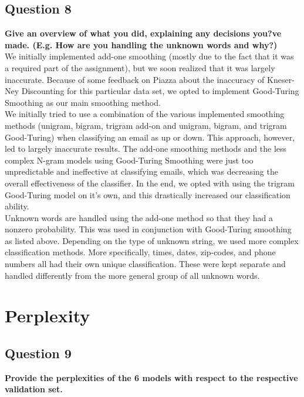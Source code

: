 \documentclass{article} %
\begin{document}
\subsection*{Question 8}

\textbf{Give an overview of what you did, explaining any decisions you?ve made. (E.g. How are you handling the unknown words and why?)}
\\

We initially implemented add-one smoothing (mostly due to the fact that it was a required part of the assignment), but we soon realized that it was largely inaccurate. Because of some feedback on Piazza about the inaccuracy of Kneser-Ney Discounting for this particular data set, we opted to implement Good-Turing Smoothing as our main smoothing method.\\

We initially tried to use a combination of the various implemented smoothing methods (unigram, bigram, trigram add-on and unigram, bigram, and trigram Good-Turing) when classifying an email as up or down. This approach, however, led to largely inaccurate results. The add-one smoothing methods and the less complex N-gram models using Good-Turing Smoothing were just too unpredictable and ineffective at classifying emails, which was decreasing the overall effectiveness of the classifier. In the end, we opted with using the trigram Good-Turing model on it's own, and this drastically increased our classification ability.\\

Unknown words are handled using the add-one method so that they had a nonzero probability. This was used in conjunction with Good-Turing smoothing as listed above. Depending on the type of unknown string, we used more complex classification methods. More specifically, times, dates, zip-codes, and phone numbers all had their own unique classification. These were kept separate and handled differently from the more general group of all unknown words.

\section{Perplexity}

\subsection*{Question 9}

\textbf{Provide the perplexities of the 6 models with respect to the respective validation set.}
\\
\end{document}
